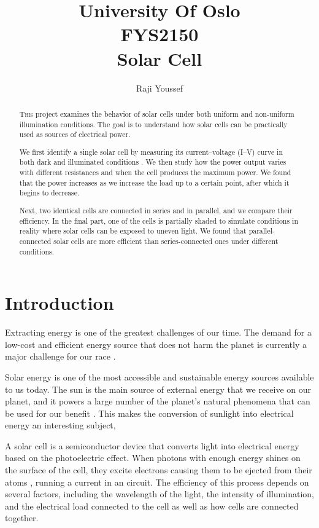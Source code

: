 \documentclass[12pt]{article}
\title{
University Of Oslo\\ 
\large FYS2150\\
\large Solar Cell\\}
\author{Raji Youssef}
\date{}
\begin{document}
\maketitle

\begin{abstract}
\lettrine[lines=1]{T}{his} project examines the behavior  of solar cells under both uniform and non-uniform illumination conditions. The goal is to understand how solar cells can be practically used as sources of electrical power.

We first identify a single solar cell by measuring its current–voltage (I–V) curve in both dark and illuminated conditions . We then study how the power output varies with different resistances and when the cell produces the maximum power. We found that the power increases as we increase the load up to a certain point, after which it begins to decrease.

Next, two identical cells are connected in series and in parallel, and we compare their efficiency. In the final part, one of the cells is partially shaded to simulate  conditions in reality  where solar cells can be exposed to uneven light. We found that parallel-connected solar cells are more efficient than series-connected ones under different conditions.  




\end{abstract}
\section{Introduction }
Extracting energy is one of the greatest challenges of our time. The demand for a low-cost and efficient energy source that does not harm the planet is currently a major challenge for our race .

Solar energy is one of the most accessible and sustainable energy sources available to us today. The sun is the main source of external energy that we receive on our  planet, and it powers a large number of the planet's natural phenomena  that can be used for our benefit  . This makes the  conversion of sunlight into electrical energy  an interesting  subject, 

A solar cell is a semiconductor device that converts  light into electrical energy based on  the photoelectric effect. When photons with enough energy shines on  the surface of the cell, they  excite electrons causing them to be ejected from their atoms , running a current in an  circuit. The efficiency of this process depends on several factors, including the wavelength of the  light, the intensity of illumination, and the electrical load connected to the cell as well as how cells are connected together. 
\end{document}
